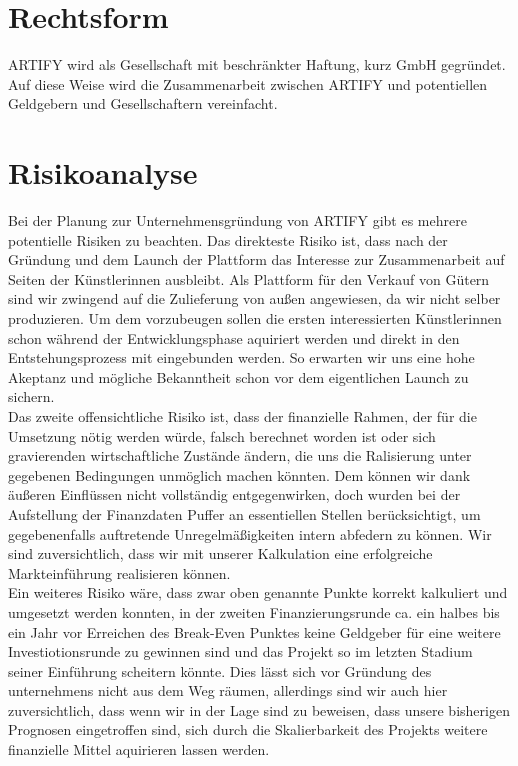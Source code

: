\documentclass[11pt,a4paper]{report}
\begin{document}
\section{Rechtsform}
ARTIFY wird als Gesellschaft mit beschränkter Haftung, kurz GmbH gegründet. Auf diese Weise wird die Zusammenarbeit zwischen ARTIFY und potentiellen Geldgebern und Gesellschaftern vereinfacht.
\section{Risikoanalyse}
Bei der Planung zur Unternehmensgründung von ARTIFY gibt es mehrere potentielle Risiken zu beachten. Das direkteste Risiko ist, dass nach der Gründung und dem Launch der Plattform das Interesse zur Zusammenarbeit auf Seiten der Künstlerinnen ausbleibt. Als Plattform für den Verkauf von Gütern sind wir zwingend auf die Zulieferung von außen angewiesen, da wir nicht selber produzieren. Um dem vorzubeugen sollen die ersten interessierten Künstlerinnen schon während der Entwicklungsphase aquiriert werden und direkt in den Entstehungsprozess mit eingebunden werden. So erwarten wir uns eine hohe Akeptanz und mögliche Bekanntheit schon vor dem eigentlichen Launch zu sichern.\\ 
Das zweite offensichtliche Risiko ist, dass der finanzielle Rahmen, der für die Umsetzung nötig werden würde, falsch berechnet worden ist oder sich gravierenden wirtschaftliche Zustände ändern, die uns die Ralisierung unter gegebenen Bedingungen unmöglich machen könnten. Dem können wir dank äußeren Einflüssen nicht vollständig entgegenwirken, doch wurden bei der Aufstellung der Finanzdaten Puffer an essentiellen Stellen berücksichtigt, um gegebenenfalls auftretende Unregelmäßigkeiten intern abfedern zu können. Wir sind zuversichtlich, dass wir mit unserer Kalkulation eine erfolgreiche Markteinführung realisieren können.\\
Ein weiteres Risiko wäre, dass zwar oben genannte Punkte korrekt kalkuliert und umgesetzt werden konnten, in der zweiten Finanzierungsrunde ca. ein halbes bis ein Jahr vor Erreichen des Break-Even Punktes keine Geldgeber für eine weitere Investiotionsrunde zu gewinnen sind und das Projekt so im letzten Stadium seiner Einführung scheitern könnte. Dies lässt sich vor Gründung des unternehmens nicht aus dem Weg räumen, allerdings sind wir auch hier zuversichtlich, dass wenn wir in der Lage sind zu beweisen, dass unsere bisherigen Prognosen eingetroffen sind, sich durch die Skalierbarkeit des Projekts weitere finanzielle Mittel aquirieren lassen werden.
\end{document}

